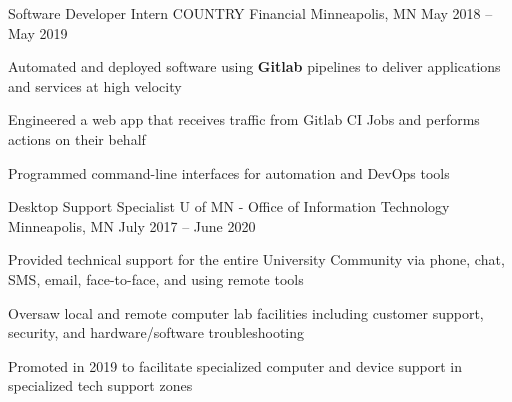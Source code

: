 \documentclass[]{awesome-cv}
\begin{document}
\begin{cventries}
	\cventry
	{Software Developer Intern}
	{COUNTRY Financial}
	{Minneapolis, MN}
	{May 2018 – May 2019}
	{\begin{cvitems}
		\item {Automated and deployed software using \textbf{Gitlab} pipelines to deliver applications and services at high velocity}
		\item {Engineered a web app that receives traffic from Gitlab CI Jobs and performs actions on their behalf}
		\item{Programmed command-line interfaces for automation and DevOps tools}
		\end{cvitems}}
	\cventry
	{Desktop Support Specialist}
	{U of MN - Office of Information Technology}
	{Minneapolis, MN}
	{July 2017 – June 2020}
	{\begin{cvitems}
		\item {Provided technical support for the entire University Community via phone, chat, SMS, email, face-to-­face, and using remote tools}
		\item {Oversaw local and remote computer lab facilities including customer support, security, and hardware/software troubleshooting}
		\item{Promoted in 2019 to facilitate specialized computer and device support in specialized tech support zones}
		\end{cvitems}}
\end{cventries}


\end{document}
